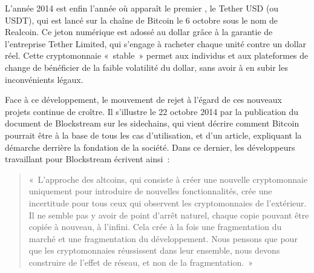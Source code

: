 L'année 2014 est enfin l'année où apparaît le premier , le Tether USD (ou USDT), qui est lancé sur la chaîne de Bitcoin le 6 octobre sous le nom de Realcoin. Ce jeton numérique est adossé au dollar grâce à la garantie de l'entreprise Tether Limited, qui s'engage à racheter chaque unité contre un dollar réel. Cette cryptomonnaie «~stable~» permet aux individus et aux plateformes de change de bénéficier de la faible volatilité du dollar, sans avoir à en subir les inconvénients légaux.

Face à ce développement, le mouvement de rejet à l'égard de ces nouveaux projets continue de croître. Il s'illustre le 22 octobre 2014 par la publication du document de Blockstream sur les sidechains, qui vient décrire comment Bitcoin pourrait être à la base de tous les cas d'utilisation, et d'un article, expliquant la démarche derrière la fondation de la société. Dans ce dernier, les développeurs travaillant pour Blockstream écrivent ainsi~:

\begin{quote}
«~L'approche des altcoins, qui consiste à créer une nouvelle cryptomonnaie uniquement pour introduire de nouvelles fonctionnalités, crée une incertitude pour tous ceux qui observent les cryptomonnaies de l'extérieur. Il ne semble pas y avoir de point d'arrêt naturel, chaque copie pouvant être copiée à nouveau, à l'infini. Cela crée à la fois une fragmentation du marché et une fragmentation du développement. Nous pensons que pour que les cryptomonnaies réussissent dans leur ensemble, nous devons construire de l'effet de réseau, et non de la fragmentation.~»
\end{quote}

